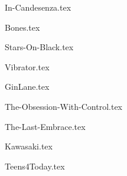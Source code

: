 \begin{songs}{}

  {In-Candesenza.tex}
  \sclearpage

  {Bones.tex}
  \sclearpage

  {Stars-On-Black.tex}
  \sclearpage
  
  {Vibrator.tex}
  \sclearpage
  
  {GinLane.tex}
  \sclearpage

  {The-Obsession-With-Control.tex}
  \sclearpage

  {The-Last-Embrace.tex}
  \sclearpage

  {Kawasaki.tex}
  \sclearpage

  {Teens4Today.tex}
  \sclearpage
\end{songs}
